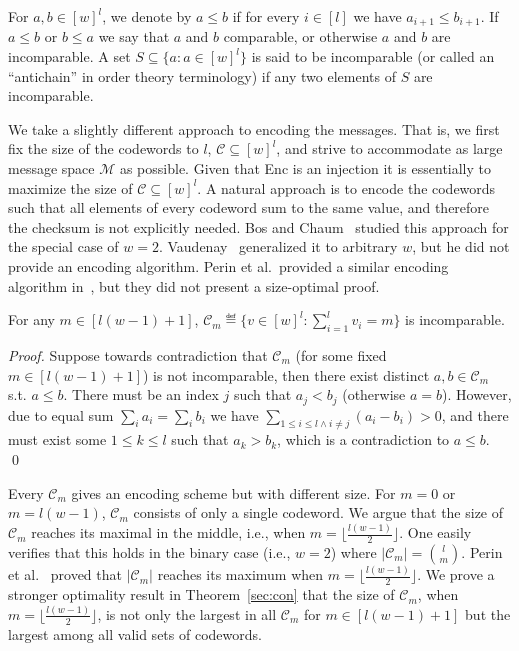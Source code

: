 \begin{definition}[(In)comparability]\label{incomparable} For  $a,b\in[w]^l$, we denote by $a \leq b$ if for every $ i \in [l]$ we have $a_{i+1}\leq b_{i+1}$.  If $a\leq b$ or $b\leq a$ we say that $a$ and $b$ comparable, or otherwise $a$ and $b$ are incomparable.
A set $S\subseteq\{a:a\in[w]^l\}$ is said to be incomparable (or called an ``antichain'' in order theory terminology) if any two elements of $S$ are incomparable. 
\end{definition}

We take a slightly different approach to encoding the messages. That is, we first fix the size of the codewords to $l$, $\mathcal{C}\subseteq[w]^{l}$, and strive to accommodate as large message space $\mathcal{M}$ as possible. Given that {\sf Enc} is an injection it is essentially to maximize the size of $\mathcal{C}\subseteq[w]^{l}$. A natural approach is to encode the codewords such that 
all elements of every codeword sum to the same value, and therefore the checksum is not explicitly needed.
Bos and Chaum~\cite{C:BosCha92} studied this approach for the special case of $w=2$.  Vaudenay~\cite{vaudenay1993one} generalized it to arbitrary $w$, but he did not provide an encoding algorithm. Perin et al.\ provided a similar encoding algorithm in~\cite{perin2021improved}, but they did not present a size-optimal proof.
 
 
\begin{theorem}
    \label{Eisantichain}
    For any $m\in[l(w-1)+1]$, 
   $\mathcal{C}_m\eqdef\{v\in [w]^l : \sum_{i=1}^l v_i = m \}$ is incomparable.
\end{theorem}
\begin{proof}
Suppose towards contradiction that $\mathcal{C}_m$ (for some fixed $m\in[l(w-1)+1]$) is not incomparable, then there exist distinct $a,b\in \mathcal{C}_m$ s.t. $a\leq b$. There must be an index $j$ such that $a_j<b_j$ (otherwise $a= b$). However, due to equal sum  $\sum_i a_i=\sum_i b_i$  we have $\sum_{1\leq i\leq l \wedge i\neq j} (a_i-b_i)>0$, and there must exist some $1\leq k\leq l$ such that $a_k>b_k$, which is a contradiction to $a\leq b$. \qed
\end{proof}

Every $\mathcal{C}_m$ gives an encoding scheme but with different size. For $m=0$ or $m=l(w-1)$, $\mathcal{C}_m$
consists of only a single codeword. We argue that the size of $\mathcal{C}_m$ reaches its maximal in the middle, i.e., when $m=\lfloor\frac{l(w-1)}{2}\rfloor$. One easily  verifies that this holds in the binary case (i.e., $w=2$) where $|\mathcal{C}_m|=\binom{l}{m}$. Perin et al.~\cite{perin2021improved} proved that $|\mathcal{C}_{m}|$ reaches its maximum 
when $m=\lfloor\frac{l(w-1)}{2}\rfloor$. We prove a stronger optimality result in Theorem~\ref{sec:con} that the size of $\mathcal{C}_{m}$, when $m=\lfloor\frac{l(w-1)}{2}\rfloor$, is not only the largest in all $\mathcal{C}_m$ for $m\in[l(w-1)+1]$ but the largest among all valid sets of codewords.

